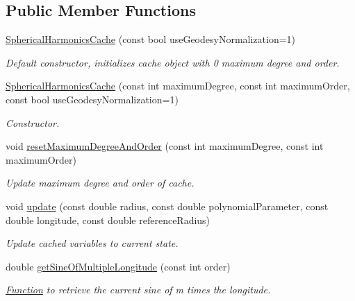 \subsection*{Public Member Functions}
\begin{DoxyCompactItemize}
\item 
\hyperlink{classtudat_1_1basic__mathematics_1_1SphericalHarmonicsCache_a095621c3ae66d15a4da13f42b118f38c}{Spherical\+Harmonics\+Cache} (const bool use\+Geodesy\+Normalization=1)
\begin{DoxyCompactList}\small\item\em Default constructor, initializes cache object with 0 maximum degree and order. \end{DoxyCompactList}\item 
\hyperlink{classtudat_1_1basic__mathematics_1_1SphericalHarmonicsCache_ad0d83a5214a9b9265a1183064e11c3a5}{Spherical\+Harmonics\+Cache} (const int maximum\+Degree, const int maximum\+Order, const bool use\+Geodesy\+Normalization=1)
\begin{DoxyCompactList}\small\item\em Constructor. \end{DoxyCompactList}\item 
void \hyperlink{classtudat_1_1basic__mathematics_1_1SphericalHarmonicsCache_a7e962b37231d1f11ed3ce1a342aba1e8}{reset\+Maximum\+Degree\+And\+Order} (const int maximum\+Degree, const int maximum\+Order)
\begin{DoxyCompactList}\small\item\em Update maximum degree and order of cache. \end{DoxyCompactList}\item 
void \hyperlink{classtudat_1_1basic__mathematics_1_1SphericalHarmonicsCache_aaeb47f6f06a4c59c72fee1176041e863}{update} (const double radius, const double polynomial\+Parameter, const double longitude, const double reference\+Radius)
\begin{DoxyCompactList}\small\item\em Update cached variables to current state. \end{DoxyCompactList}\item 
double \hyperlink{classtudat_1_1basic__mathematics_1_1SphericalHarmonicsCache_acbc9bd4ed0a69f57e0cb2eb75c908cd5}{get\+Sine\+Of\+Multiple\+Longitude} (const int order)
\begin{DoxyCompactList}\small\item\em \hyperlink{classtudat_1_1basic__mathematics_1_1Function}{Function} to retrieve the current sine of m times the longitude. \end{DoxyCompactList}\item 

\end{DoxyCompactItemize}
